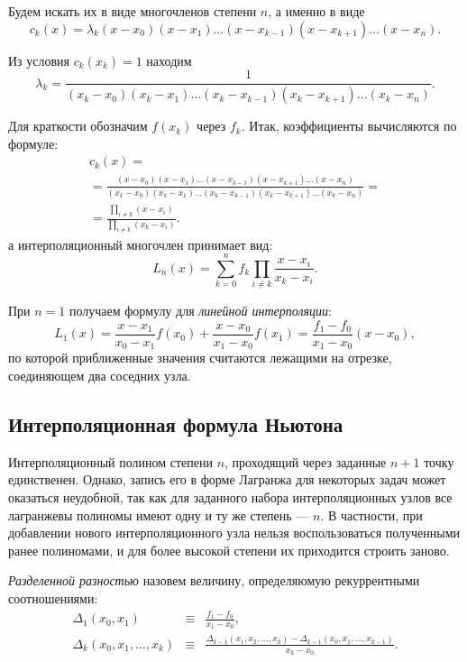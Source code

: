 Будем искать их в виде многочленов степени $n$, а именно в виде
\[
c_{k}(x)=\lambda_{k}(x-x_{0})(x-x_{1})\dots(x-x_{k-1})(x-x_{k+1})\dots(x-x_{n}).
\]


Из условия $c_{k}(x_{k})=1$ находим
\[
\lambda_{k}=\frac{1}{(x_{k}-x_{0})(x_{k}-x_{1})\dots(x_{k}-x_{k-1})(x_{k}-x_{k+1})\dots(x_{k}-x_{n})}.
\]


Для краткости обозначим $f(x_{k})$ через $f_{k}$. Итак, коэффициенты
вычисляются по формуле:
\begin{multline*}
c_{k}(x)=\\
=\frac{(x-x_{0})(x-x_{1})\dots(x-x_{k-1})(x-x_{k+1})\dots(x-x_{n})}{(x_{k}-x_{0})(x_{k}-x_{1})\dots(x_{k}-x_{k-1})(x_{k}-x_{k+1})\dots(x_{k}-x_{n})}=\\
=\frac{\prod_{i\neq k}(x-x_{i})}{\prod_{i\neq k}(x_{k}-x_{i})}.
\end{multline*}
а интерполяционный многочлен принимает вид:
\[
L_{n}(x)=\sum_{k=0}^{n}f_{k}\prod_{i\neq k}\frac{x-x_{i}}{x_{k}-x_{i}}.
\]


При $n=1$ получаем формулу для \emph{линейной интерполяции}:
\[
L_{1}(x)=\frac{x-x_{1}}{x_{0}-x_{1}}f(x_{0})+\frac{x-x_{0}}{x_{1}-x_{0}}f(x_{1})=\frac{f_{1}-f_{0}}{x_{1}-x_{0}}(x-x_{0}),
\]
по которой приближенные значения считаются лежащими на отрезке, соединяющем
два соседних узла.


\subsection{Интерполяционная формула Ньютона}

Интерполяционный полином степени $n$, проходящий через заданные $n+1$
точку единственен. Однако, запись его в форме Лагранжа для некоторых
задач может оказаться неудобной, так как для заданного набора интерполяционных
узлов все лагранжевы полиномы имеют одну и ту же степень --- $n$.
В частности, при добавлении нового интерполяционного узла нельзя воспользоваться
полученными ранее полиномами, и для более высокой степени их приходится
строить заново.

\emph{Разделенной разностью}
назовем величину, определяюмую рекуррентными соотношениями:
\begin{eqnarray*}
\Delta_{1}(x_{0},x_{1}) & \equiv & \frac{f_{1}-f_{0}}{x_{1}-x_{0}},\\
\Delta_{k}(x_{0},x_{1},\dots,x_{k}) & \equiv & \frac{\Delta_{k-1}(x_{1},x_{2},\dots,x_{k})-\Delta_{k-1}(x_{0},x_{1},\dots,x_{k-1})}{x_{k}-x_{0}}.
\end{eqnarray*}


